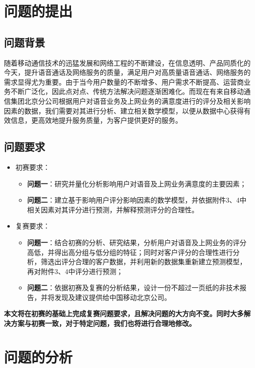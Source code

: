 \documentclass{MathorCupmodeling}
\begin{document}
	\pagestyle{empty}
	\tableofcontents
	\newpage
	\pagestyle{fancy}

	\setcounter{page}{1}
	\section{问题的提出}
	\subsection{问题背景}
	随着移动通信技术的迅猛发展和网络工程的不断建设，在信息透明、产品同质化的今天，提升语音通话及网络服务的质量，满足用户对高质量语音通话、网络服务的需求显得尤为重要。由于当今用户数量的不断增多、用户需求不断提高、运营商业务不断广泛化，因此点对点、传统方法解决问题逐渐困难化。而现在有来自移动通信集团北京分公司根据用户对语音业务及上网业务的满意度进行的评分及相关影响因素的数据，我们需要对其进行分析、建立相关数学模型，以便从数据中心获得有效信息，更高效地提升服务质量，为客户提供更好的服务。
	\subsection{问题要求}
	\begin{itemize}
		\item 初赛要求：
		\begin{itemize}
			\item \textbf{问题一}：研究并量化分析影响用户对语音及上网业务满意度的主要因素；
			\item \textbf{问题二}：建立基于影响用户评分影响因素的数学模型，并依据附件3、4中相关因素对其评分进行预测，并解释预测评分的合理性。
		\end{itemize}
		\item 复赛要求：
		\begin{itemize}
			\item \textbf{问题一}：结合初赛的分析、研究结果，分析用户对语音及上网业务的评分高低，并得出高分组与低分组的特征；同时对客户评分的合理性进行分析，筛选出评分合理的客户数据，并利用新的数据集重新建立预测模型，再对附件3、4中评分进行预测；
			\item \textbf{问题二}：依据初赛及复赛的分析结果，设计一份不超过一页纸的非技术报告，并将发现及建议提供给中国移动北京公司。
		\end{itemize}
	\end{itemize}

	\textbf{本文将在初赛的基础上完成复赛问题要求，且解决问题的大方向不变。同时大多解决方案与初赛一致，对于特定问题，我们也将进行合理地修改。}

	\section{问题的分析}
\end{document}
